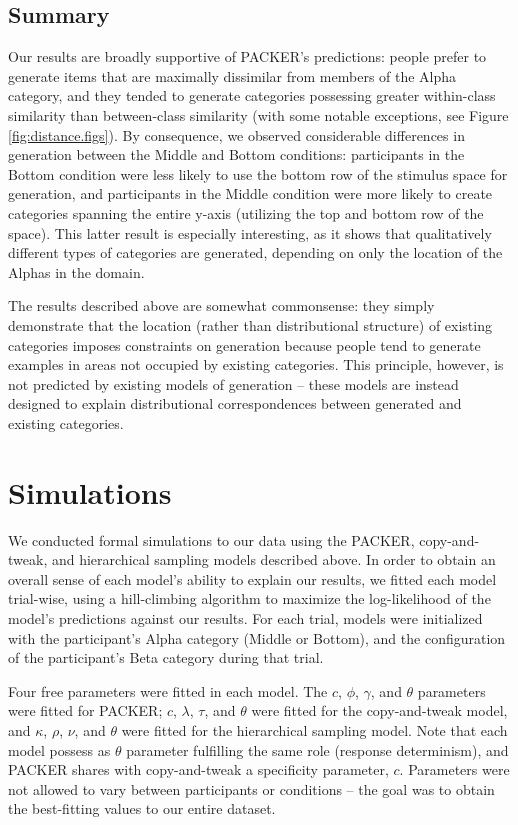 \documentclass[10pt,letterpaper]{article}
\begin{document}
\subsection{Summary}

Our results are broadly supportive of PACKER's predictions: people prefer to generate items that are maximally dissimilar from members of the Alpha category, and they tended to generate categories possessing greater within-class similarity than between-class similarity (with some notable exceptions, see Figure \ref{fig:distance.figs}). By consequence, we observed considerable differences in generation between the Middle and Bottom conditions: participants in the Bottom condition were less likely to use the bottom row of the stimulus space for generation, and participants in the Middle condition were more likely to create categories spanning the entire y-axis (utilizing the top and bottom row of the space). This latter result is especially interesting, as it shows that qualitatively different types of categories are generated, depending on only the location of the Alphas in the domain.

The results described above are somewhat commonsense: they simply demonstrate that the location (rather than distributional structure) of existing categories imposes constraints on generation because people tend to generate examples in areas not occupied by existing categories. This principle, however, is not predicted by existing models of generation -- these models are instead designed to explain distributional correspondences between generated and existing categories.  


\section{Simulations}

We conducted formal simulations to our data using the PACKER, copy-and-tweak, and hierarchical sampling models described above. In order to obtain an overall sense of each model's ability to explain our results, we fitted each model trial-wise, using a hill-climbing algorithm to maximize the log-likelihood of the model's predictions against our results. For each trial, models were initialized with the participant's Alpha category (Middle or Bottom), and the configuration of the participant's Beta category during that trial. 

Four free parameters were fitted in each model. The $c$, $\phi$, $\gamma$, and $\theta$ parameters were fitted for PACKER; $c$, $\lambda$, $\tau$, and $\theta$ were fitted for the copy-and-tweak model, and $\kappa$, $\rho$, $\nu$, and $\theta$ were fitted for the hierarchical sampling model. Note that each model possess as $\theta$ parameter fulfilling the same role (response determinism), and PACKER shares with copy-and-tweak a specificity parameter, $c$. Parameters were not allowed to vary between participants or conditions -- the goal was to obtain the best-fitting values to our entire dataset.
\end{document}
